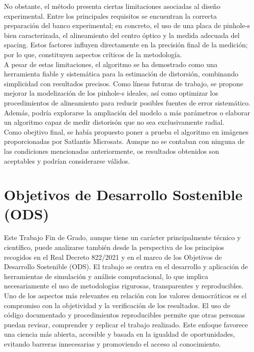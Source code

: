 \documentclass[12pt]{article}
\numberwithin{equation}{section}%
\newcommand{\lightit}[1]{{\lightitfont #1}}
\begin{document}
No obstante, el método presenta ciertas limitaciones asociadas al diseño experimental. Entre los principales requisitos se encuentran la correcta preparación del banco experimental; en concreto, el uso de una placa de \lightit{pinhole}-s bien caracterizada, el alineamiento del centro óptico y la medida adecuada del \lightit{spacing}. Estos factores influyen directamente en la precisión final de la medición; por lo que, constituyen aspectos críticos de la metodología.\\

A pesar de estas limitaciones, el algoritmo se ha demostrado como una herramienta fiable y sistemática para la estimación de distorsión, combinando simplicidad con resultados precisos. Como líneas futuras de trabajo, se propone mejorar la modelización de los \lightit{pinhole}-s ideales, así como optimizar los procedimientos de alineamiento para reducir posibles fuentes de error sistemático. Además, podría explorarse la ampliación del modelo a más parámetros o elaborar un algoritmo capaz de medir distorisón que no sea exclusivamente radial.\\

Como obejtivo final, se había propuesto poner a prueba el algoritmo en imágenes proporcionadas por Satlantis Microsats. Aunque no se contaban con ninguna de las condiciones mencionadas anteriormente, os resultados obtenidos son aceptables y podrían considerarse válidos.

\section{Objetivos de Desarrollo Sostenible (ODS)}

Este Trabajo Fin de Grado, aunque tiene un carácter principalmente técnico y científico, puede analizarse también desde la perspectiva de los principios recogidos en el Real Decreto 822/2021 y en el marco de los Objetivos de Desarrollo Sostenible (ODS). El trabajo se centra en el desarrollo y aplicación de herramientas de simulación y análisis computacional, lo que implica necesariamente el uso de metodologías rigurosas, transparentes y reproducibles.\\

Uno de los aspectos más relevantes en relación con los valores democráticos es el compromiso con la objetividad y la verificación de los resultados. El uso de código documentado y procedimientos reproducibles permite que otras personas puedan revisar, comprender y replicar el trabajo realizado. Este enfoque favorece una ciencia más abierta, accesible y basada en la igualdad de oportunidades, evitando barreras innecesarias y promoviendo el acceso al conocimiento.\\
\end{document}

